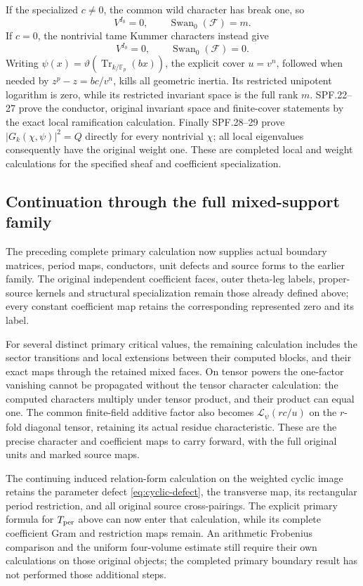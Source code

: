 If the specialized \(c\ne0\), the common wild character has break
one, so
\[
 V^{I_0}=0,\qquad \operatorname{Swan}_0(\mathcal F)=m.
\]
If \(c=0\), the nontrivial tame Kummer characters instead give
\[
 V^{I_0}=0,\qquad \operatorname{Swan}_0(\mathcal F)=0.
\]
Writing \(\psi(x)=\vartheta(\operatorname{Tr}_{k/\mathbb F_p}(bx))\),
the explicit cover \(u=v^n\), followed when needed by
\(z^p-z=bc/v^n\), kills all geometric inertia.  Its restricted
unipotent logarithm is zero, while its restricted invariant space
is the full rank \(m\).  SPF.22--27 prove the conductor, original
invariant space and finite-cover statements by the exact local
ramification calculation.
Finally SPF.28--29 prove
\(|G_k(\chi,\psi)|^2=Q\) directly for every nontrivial \(\chi\);
all local eigenvalues consequently have the original weight one.
These are completed local and weight calculations for the specified
sheaf and coefficient specialization.

\subsection{Continuation through the full mixed-support family}

The preceding complete primary calculation now supplies actual
boundary matrices, period maps, conductors, unit defects and source
forms to the earlier family.  The original independent coefficient
faces, outer theta-leg labels, proper-source kernels and structural
specialization remain those already defined above; every constant
coefficient map retains the corresponding represented zero and its
label.

For several distinct primary critical values, the remaining
calculation includes the sector transitions and local extensions
between their computed blocks, and their exact maps through the
retained mixed faces.  On tensor powers the one-factor vanishing
cannot be propagated without the tensor character calculation:
the computed characters multiply under tensor product, and their
product can equal one.  The common finite-field additive factor
also becomes \(\mathcal L_\psi(rc/u)\) on the \(r\)-fold diagonal
tensor, retaining its actual residue characteristic.  These are
the precise character and coefficient maps to carry forward,
with the full original units and marked source maps.

The continuing induced relation-form calculation on the weighted
cyclic image retains the parameter defect
\eqref{eq:cyclic-defect}, the transverse map, its rectangular period
restriction, and all original source cross-pairings.  The explicit
primary formula for \(T_{\rm per}\) above can now enter that
calculation, while its complete coefficient Gram and restriction
maps remain.  An arithmetic Frobenius comparison and the uniform
four-volume estimate still require their own calculations on those
original objects; the completed primary boundary result has not
performed those additional steps.
